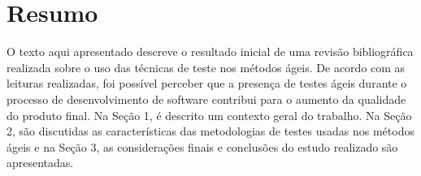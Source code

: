 \chapter*{Resumo}

O texto aqui apresentado descreve o resultado inicial de uma revisão bibliográfica realizada sobre o uso das técnicas de teste nos métodos ágeis. De acordo com as leituras realizadas, foi possível perceber que a presença de testes ágeis durante o processo de desenvolvimento de software contribui para o aumento da qualidade do produto final. Na Seção 1, é descrito um contexto geral do trabalho. Na Seção 2, são discutidas as características das metodologias de testes usadas nos métodos ágeis e na Seção 3, as considerações finais e conclusões do estudo realizado são apresentadas.  
